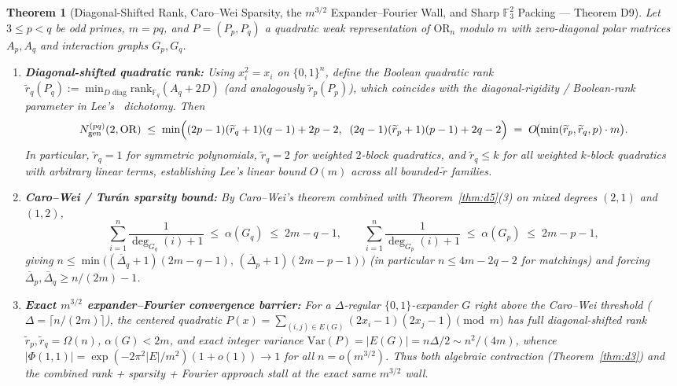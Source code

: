 \documentclass[11pt,a4paper]{article}
\newtheorem{theorem}{Theorem}[section]
\theoremstyle{definition}
\newcommand{\F}{\mathbb{F}}
\newcommand{\OR}{\mathrm{OR}}
\begin{document}
\begin{theorem}[Diagonal-Shifted Rank, Caro--Wei Sparsity, the $m^{3/2}$ Expander--Fourier Wall, and Sharp $\F_3^2$ Packing --- Theorem D9]
\label{thm:d9}
Let $3 \le p < q$ be odd primes, $m = pq$, and $P = (P_p, P_q)$ a quadratic weak representation of $\OR_n$ modulo $m$ with zero-diagonal polar matrices $A_p, A_q$ and interaction graphs $G_p, G_q$.
\begin{enumerate}[leftmargin=*,nosep]
  \item \textbf{Diagonal-shifted quadratic rank:} Using $x_i^2 = x_i$ on $\{0, 1\}^n$, define the Boolean quadratic rank $\widetilde{r}_q(P_q) := \min_{D \text{ diag}} \mathrm{rank}_{\F_q}(A_q + 2D)$ (and analogously $\widetilde{r}_p(P_p)$), which coincides with the diagonal-rigidity / Boolean-rank parameter in Lee's~\cite{Lee15} dichotomy. Then
  \[
    N_{\mathrm{gen}}^{(pq)}(2, \OR) \;\le\; \min\Bigl((2p - 1)(\widetilde{r}_q + 1)(q - 1) + 2p - 2,\;\; (2q - 1)(\widetilde{r}_p + 1)(p - 1) + 2q - 2\Bigr) \;=\; O\!\bigl(\min(\widetilde{r}_p, \widetilde{r}_q, p)\cdot m\bigr).
  \]
  In particular, $\widetilde{r}_q = 1$ for symmetric polynomials, $\widetilde{r}_q = 2$ for weighted $2$-block quadratics, and $\widetilde{r}_q \le k$ for all weighted $k$-block quadratics with arbitrary linear terms, establishing Lee's linear bound $O(m)$ across all bounded-$\widetilde{r}$ families.
  \item \textbf{Caro--Wei / Tur\'an sparsity bound:} By Caro--Wei's theorem combined with Theorem~\ref{thm:d5}(3) on mixed degrees $(2, 1)$ and $(1, 2)$,
  \[
    \sum_{i=1}^n \frac{1}{\deg_{G_q}(i) + 1} \;\le\; \alpha(G_q) \;\le\; 2m - q - 1,
    \qquad
    \sum_{i=1}^n \frac{1}{\deg_{G_p}(i) + 1} \;\le\; \alpha(G_p) \;\le\; 2m - p - 1,
  \]
  giving $n \le \min\bigl((\overline{\Delta}_q + 1)(2m - q - 1),\, (\overline{\Delta}_p + 1)(2m - p - 1)\bigr)$ (in particular $n \le 4m - 2q - 2$ for matchings) and forcing $\overline{\Delta}_p, \overline{\Delta}_q \ge n/(2m) - 1$.
  \item \textbf{Exact $m^{3/2}$ expander--Fourier convergence barrier:} For a $\Delta$-regular $\{0,1\}$-expander $G$ right above the Caro--Wei threshold ($\Delta = \lceil n/(2m) \rceil$), the centered quadratic $P(x) = \sum_{(i,j) \in E(G)} (2x_i - 1)(2x_j - 1) \pmod m$ has full diagonal-shifted rank $\widetilde{r}_p, \widetilde{r}_q = \Omega(n)$, $\alpha(G) < 2m$, and exact integer variance $\mathrm{Var}(P) = |E(G)| = n\Delta/2 \sim n^2/(4m)$, whence $|\Phi(1, 1)| = \exp(-2\pi^2 |E|/m^2)(1 + o(1)) \to 1$ for all $n = o(m^{3/2})$. Thus both algebraic contraction (Theorem~\ref{thm:d3}) and the combined rank + sparsity + Fourier approach stall at the exact same $m^{3/2}$ wall.

\end{enumerate}
\end{theorem}
\end{document}

